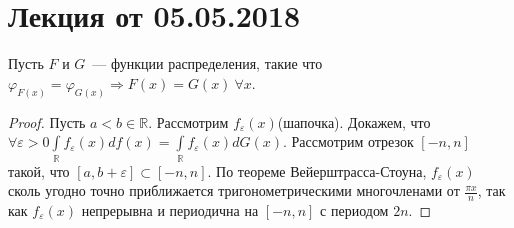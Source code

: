 \section{Лекция от 05.05.2018}
	\begin{theorem}[единственности]
		Пусть \(F\) и \(G\)~--- функции распределения, такие что \(\varphi_{F(x)} = \varphi_{G(x)} \Rightarrow F(x) = G(x)~\forall x.\)
	\end{theorem}
	\begin{proof}
		Пусть \(a < b \in \mathbb{R}\). Рассмотрим \(f_\varepsilon(x)\)(шапочка). Докажем, что \(\forall \varepsilon > 0 \int\limits_{\mathbb{R}} f_\varepsilon(x) df(x) = \int\limits_\mathbb{R}f_\varepsilon(x)dG(x).\) Рассмотрим отрезок \([-n, n]\) такой, что \([a, b + \varepsilon] \subset [-n, n].\) По теореме Вейерштрасса-Стоуна, \(f_\varepsilon(x)\) сколь угодно точно приближается тригонометрическими многочленами от \(\frac{\pi x}{n}\), так как \(f_\varepsilon(x)\) непрерывна и периодична на \([-n, n]\) с периодом \(2n.\)


\end{proof}
